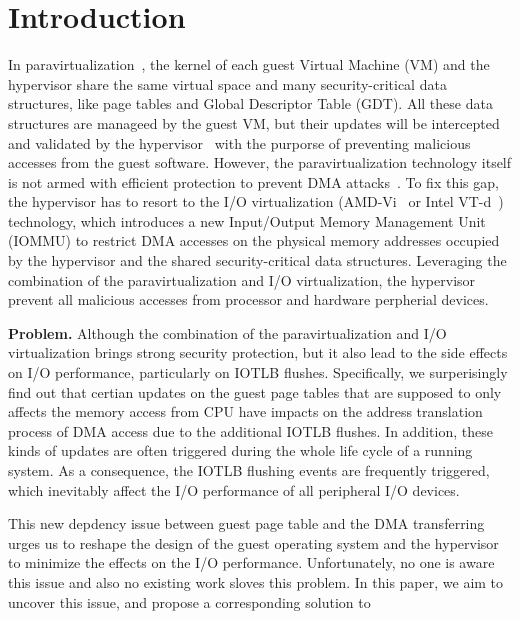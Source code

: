 \section{Introduction} \label{sec:intro}
In paravirtualization~\cite{XEN-SOSP03,denali-paravirtualization}, the kernel of each guest Virtual Machine (VM) and the hypervisor share the same virtual space and many security-critical data structures, like page tables and Global Descriptor Table (GDT). All these data structures are manageed by the guest VM, but their updates will be intercepted and validated by the hypervisor~\cite{XEN-SOSP03} with the purporse of preventing malicious accesses from the guest software.
However, the paravirtualization technology itself is not armed with efficient protection to prevent DMA attacks~\cite{disaggregation}.
To fix this gap, the hypervisor has to resort to the I/O virtualization (AMD-Vi~\cite{amdvt} or Intel VT-d~\cite{intelvt}) technology, which introduces a new Input/Output Memory Management Unit (IOMMU) to restrict DMA accesses on the physical memory addresses occupied by the hypervisor and the shared security-critical data structures. 
Leveraging the combination of the paravirtualization and I/O virtualization, the hypervisor prevent all malicious accesses from processor and hardware perpherial devices.

\textbf{Problem.} Although the combination of the paravirtualization and I/O virtualization brings strong security protection, but it also lead to the side effects on I/O performance, particularly on IOTLB flushes. 
Specifically, we surperisingly find out that certian updates on the guest page tables that are supposed to only affects the memory access from CPU have impacts on  the address translation process of DMA access due to the additional IOTLB flushes. 
In addition, these kinds of updates are often triggered during the whole life cycle of a running system.
As a consequence, the IOTLB flushing events are frequently triggered, which inevitably affect the I/O performance of all peripheral I/O devices.


This new depdency issue between guest page table and the DMA transferring urges us to reshape the design of the guest operating system and the hypervisor to minimize the effects on the I/O performance. 
Unfortunately, no one is aware this issue and also no existing work sloves this problem.
In this paper, we aim to uncover this issue, and propose a corresponding solution to 

